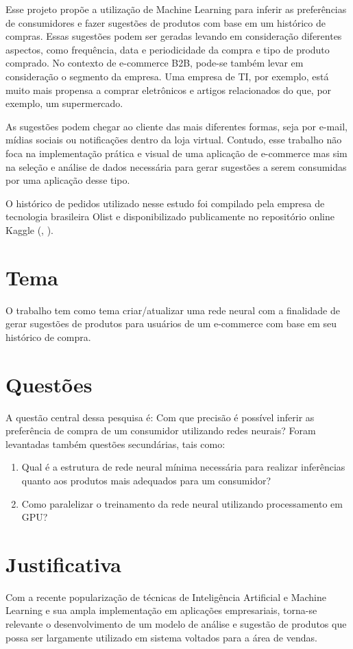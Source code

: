 Esse projeto propõe a utilização de Machine Learning para inferir as preferências de consumidores e fazer sugestões de produtos com base em um histórico de compras. Essas sugestões podem ser geradas levando em consideração diferentes aspectos, como frequência, data e periodicidade da compra e tipo de produto comprado. No contexto de e-commerce B2B, pode-se também levar em consideração o segmento da empresa. Uma empresa de TI, por exemplo, está muito mais propensa a comprar eletrônicos e artigos relacionados do que, por exemplo, um supermercado.

As sugestões podem chegar ao cliente das mais diferentes formas, seja por e-mail, mídias sociais ou notificações dentro da loja virtual. Contudo, esse trabalho não foca na implementação prática e visual de uma aplicação de e-commerce mas sim na seleção e análise de dados necessária para gerar sugestões a serem consumidas por uma aplicação desse tipo.

O histórico de pedidos utilizado nesse estudo foi compilado pela empresa de tecnologia brasileira Olist e disponibilizado publicamente no repositório online Kaggle (\citeauthor{olist20}, \citeyear{olist20}).

\section{Tema}
O trabalho tem como tema criar/atualizar uma rede neural com a finalidade de gerar sugestões de produtos para usuários de um e-commerce com base em seu histórico de compra.

\section{Questões}
A questão central dessa pesquisa é: Com que precisão é possível inferir as preferência de compra de um consumidor utilizando redes neurais? Foram levantadas também questões secundárias, tais como:
\begin{enumerate}
\item Qual é a estrutura de rede neural mínima necessária para realizar inferências quanto aos produtos mais adequados para um consumidor?
\item Como paralelizar o treinamento da rede neural utilizando processamento em GPU?
\end{enumerate}

\section{Justificativa}
Com a recente popularização de técnicas de Inteligência Artificial e Machine Learning e sua ampla implementação em aplicações empresariais, torna-se relevante o desenvolvimento de um modelo de análise e sugestão de produtos que possa ser largamente utilizado em sistema voltados para a área de vendas.

